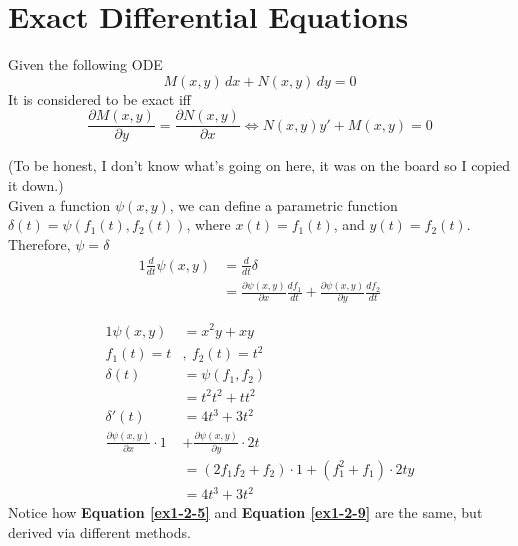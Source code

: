 \documentclass[diffeq.tex]{subfiles}
\begin{document}
    \section{Exact Differential Equations}
    \begin{definition}[Exact DE]
        Given the following ODE
        \begin{equation}
            M(x, y)\,dx + N(x, y)\,dy = 0
        \end{equation}
        It is considered to be exact iff
        \begin{equation}
            \frac{\partial M(x,y)}{\partial y} = \frac{\partial N(x,y)}{\partial x} \Leftrightarrow N(x, y)y' + M(x, y) = 0
        \end{equation}
    \end{definition}
    (To be honest, I don't know what's going on here, it was on the board so I copied it down.)\\[1em]
    Given a function $\psi(x, y)$, we can define a parametric function $\delta(t) = \psi(f_{1}(t), f_{2}(t))$, where $x(t) = f_{1}(t)$, and $y(t) = f_{2}(t)$. Therefore, $\psi = \delta$
    \begin{alignat}{1}
        \frac{d}{dt}\psi(x, y) &= \frac{d}{dt}\delta\\
        &= \frac{\partial \psi(x, y)}{\partial x}\frac{df_{1}}{dt} + \frac{\partial \psi(x, y)}{\partial y}\frac{df_{2}}{dt}
    \end{alignat}
    \begin{example}
        \begin{alignat}{1}
            \psi(x, y) &= x^{2}y + xy\\
            f_{1}(t) = t&,\ f_{2}(t) = t^{2}\\
            \delta(t) &= \psi(f_{1}, f_{2})\\
            &= t^{2}t^{2}+t t^{2}\\
            \delta'(t) &= 4t^{3} + 3t^{2}\label{ex1-2-5}\\
            \frac{\partial \psi(x, y)}{\partial x}\cdot 1 &+ \frac{\partial \psi(x, y)}{\partial y}\cdot2t\\
            &= (2f_{1}f_{2} + f_{2})\cdot 1 + (f_{1}^{2} + f_{1})\cdot 2ty\\
            &= 4t^{3} + 3t^{2}\label{ex1-2-9}
        \end{alignat}
        Notice how \textbf{Equation \ref{ex1-2-5}} and \textbf{Equation \ref{ex1-2-9}} are the same, but derived via different methods.
    \end{example}
\end{document}

